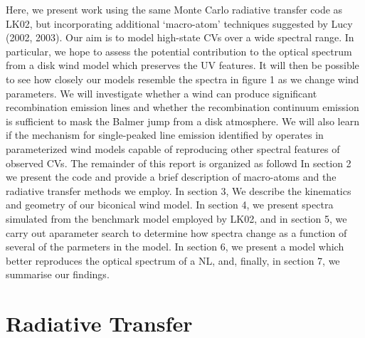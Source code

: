 \documentclass[preprint, a4paper, 11pt]{aastex}
\begin{document}
{Here, we present work using the same Monte Carlo radiative transfer code as LK02, 
but incorporating additional `macro-atom' techniques suggested by Lucy (2002, 2003). 
Our aim is to model high-state CVs over a wide spectral range.
In particular, we hope to assess the potential contribution
to the optical spectrum from a disk wind model which preserves the UV features.
It will then be possible to see how closely
our models resemble the spectra in figure 1 as we change wind parameters.
We will investigate whether a wind can produce significant
recombination emission lines and whether the recombination
continuum emission is sufficient to mask the Balmer jump from a disk atmosphere.
We will also learn if the mechanism for single-peaked line emission
identified by \cite{MC96} operates  in  parameterized wind models capable of reproducing 
other spectral features of observed CVs.  The remainder of this report is organized as followd
In section 2 we present the code and provide a brief description of macro-atoms 
and the radiative transfer methods we employ.  In section 3, 
We describe the kinematics and geometry of our biconical wind model.
In section 4, we present spectra simulated from the benchmark model employed by LK02, and in section 5, we carry out 
aparameter search to determine how spectra change as a function of several of the parmeters in the model. In section 6, we present a
model which better reproduces the optical spectrum of a NL, and, 
finally, in section 7, we summarise our findings.










%
%

\section{Radiative Transfer}

}
\end{document}

